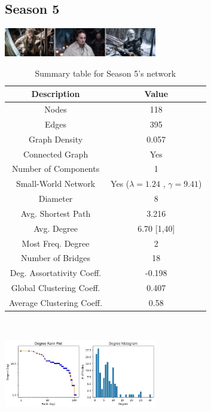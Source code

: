 \documentclass[10pt,twocolumn,letterpaper]{article}
\begin{document}
\subsection{Season 5}

\begin{center}
    \includegraphics[width=0.5\textwidth]{img/s5/s5_frames.jpg}
\end{center}


\begin{table}[!h]
    \centering
    \small
    \begin{tabular}{c|c}
        Description & Value  \\
        \hline
        Nodes & 118\\
        Edges & 395 \\
        Graph Density & 0.057 \\
        Connected Graph & Yes \\
        Number of Components & 1 \\
        Small-World Network & Yes ($\lambda=1.24$ , $\gamma=9.41$) \\
        Diameter & 8 \\
        Avg. Shortest Path & 3.216 \\
        Avg. Degree & 6.70 [1,40] \\
        Most Freq. Degree & 2 \\
        Number of Bridges & 18 \\
        Deg. Assortativity Coeff. & -0.198\\
        Global Clustering Coeff. & 0.407 \\
        Average Clustering Coeff. & 0.58 \\
        \hline 
    \end{tabular}
    \vspace{0.2cm}
    \caption{Summary table for Season 5's network}
    \label{tab:my_label}
\end{table} \\

\begin{center}
    \includegraphics[width=0.5\textwidth]{img/s5/degree_plot.jpg}
\end{center}
\end{document}
